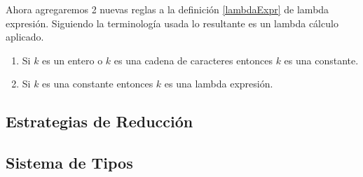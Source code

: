 Ahora agregaremos 2 nuevas reglas a la definición \ref{lambdaExpr} 
de lambda expresión. Siguiendo la terminología usada lo resultante 
es un lambda cálculo aplicado. 

\begin{enumerate}
\item Si $k$ es un entero o $k$ es una cadena de caracteres entonces $k$ es una
  constante.
\item Si $k$ es una constante entonces $k$ es una lambda expresión.
\end{enumerate}

\subsection{Estrategias de Reducción}
\subsection{Sistema de Tipos}

